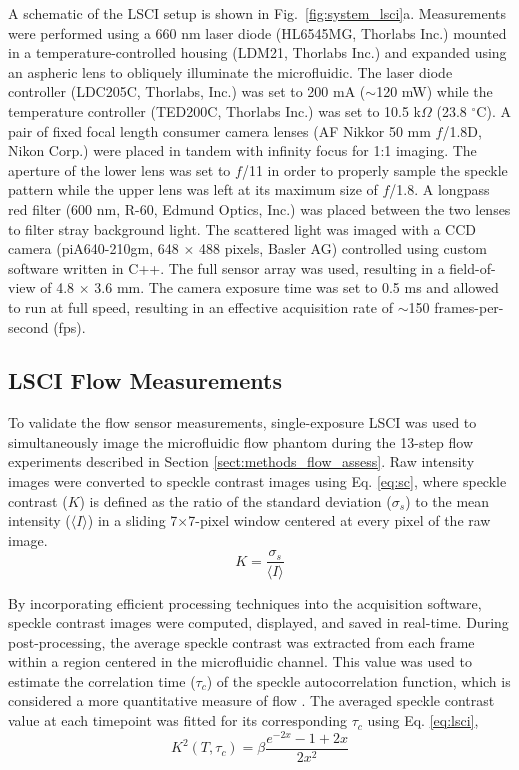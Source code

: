 \documentclass[12pt]{spieman}
\begin{document}
\begin{spacing}{2}
A schematic of the LSCI setup is shown in Fig.~\ref{fig:system_lsci}a. Measurements were performed using a 660 nm laser diode (HL6545MG, Thorlabs Inc.) mounted in a temperature-controlled housing (LDM21, Thorlabs Inc.) and expanded using an aspheric lens to obliquely illuminate the microfluidic. The laser diode controller (LDC205C, Thorlabs, Inc.) was set to 200 mA ($\sim$120 mW) while the temperature controller (TED200C, Thorlabs Inc.) was set to 10.5 k$\Omega$ (23.8 $^\circ$C). A pair of fixed focal length consumer camera lenses (AF Nikkor 50 mm $f$/1.8D, Nikon Corp.) were placed in tandem with infinity focus for 1:1 imaging. The aperture of the lower lens was set to 
$f$/11 in order to properly sample the speckle pattern \cite{Kirkpatrick:2008ke} while the upper lens was left at its maximum size of $f$/1.8. A longpass red filter (600 nm, R-60, Edmund Optics, Inc.) was placed between the two lenses to filter stray background light. The scattered light was imaged with a CCD camera (piA640-210gm, 648 $\times$ 488 pixels, Basler AG) controlled using custom software written in C++. The full sensor array was used, resulting in a field-of-view of 4.8 $\times$ 3.6 mm. The camera exposure time was set to 0.5 ms 
and allowed to run at full speed, resulting in an effective acquisition rate of $\sim$150 frames-per-second (fps).


\subsection{LSCI Flow Measurements}
\label{sect:methods_lsci}

To validate the flow sensor measurements, single-exposure LSCI was used to simultaneously image the microfluidic flow phantom during the 13-step flow experiments described in Section \ref{sect:methods_flow_assess}. Raw intensity images were converted to speckle contrast images using Eq. \ref{eq:sc}, where speckle contrast ($K$) is defined as the ratio of the standard deviation ($\sigma_{s}$) to the mean intensity ($\langle{I}\rangle$) in a sliding 7$\times$7-pixel window centered at every pixel of the raw image.
%
\begin{equation}
    \label{eq:sc}
    K = \frac{\sigma_{s}}{\langle{I}\rangle}
\end{equation}

By incorporating efficient processing techniques\cite{Tom:2008tg} into the acquisition software, speckle contrast images were computed, displayed, and saved in real-time. During post-processing, the average speckle contrast was extracted from each frame within a region centered in the microfluidic channel. This value was used to estimate the correlation time ($\tau_{c}$) of the speckle autocorrelation function, which is considered a more quantitative measure of flow \cite{Briers:1996kfa}. The averaged speckle contrast value at each timepoint was fitted for its corresponding $\tau_{c}$ using Eq. \ref{eq:lsci},
%
\begin{equation}
    \label{eq:lsci}
    K^2(T, \tau_{c}) = \beta\frac{e^{-2x}-1+2x}{2x^2}
\end{equation}


\end{spacing}
\end{document}
